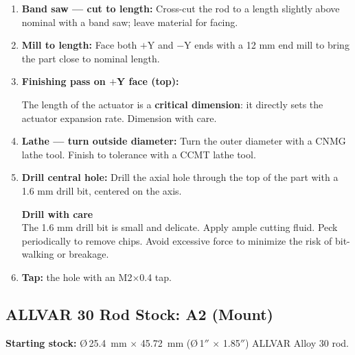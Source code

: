 \documentclass[12pt, letterpaper]{report}%
\newcounter{mycounter}           %
\newcounter{sub}[mycounter]      %
\begin{document}
\begin{appendices}
	\begin{enumerate}[itemsep=4pt]
		\item \textbf{Band saw --- cut to length:} Cross-cut the rod to a length slightly
					above nominal with a band saw; leave material for facing.
		\item \textbf{Mill to length:} Face both $+$Y and $-$Y ends with a 12 mm end mill to bring the part close to nominal length.
		\item \textbf{Finishing pass on $+$Y face (top):}
					\begin{notebox}
					The length of the actuator is a
					\textbf{critical dimension}: it directly sets the actuator expansion rate.
					Dimension with care.
					\end{notebox}
		\item \textbf{Lathe --- turn outside diameter:} Turn the outer diameter with a CNMG lathe tool.
					Finish to tolerance with a CCMT lathe tool.
		\item \textbf{Drill central hole:} Drill the axial hole
					through the top of the part with a 1.6 mm drill bit, centered on the axis.
					\newpage
					\begin{notebox}
					\textbf{Drill with care}\\
					The 1.6 mm drill bit is small and delicate.
					Apply ample cutting fluid. Peck periodically to remove chips.
					Avoid excessive force to minimize the risk of bit-walking or breakage.
					\end{notebox}
		\item \textbf{Tap:} the hole with an M2$\times$0.4 tap.
	\end{enumerate}

	\subsection{ALLVAR 30 Rod Stock: A2 (Mount)}
	\label{sec:mfg:A2}

	\textbf{Starting stock:}
	\O\,\SI{25.4}{\milli\meter} $\times$ \SI{45.72}{\milli\meter}
	(\O\,1$''$ $\times$ 1.85$''$) ALLVAR Alloy 30 rod.


\end{appendices}
\end{document}
